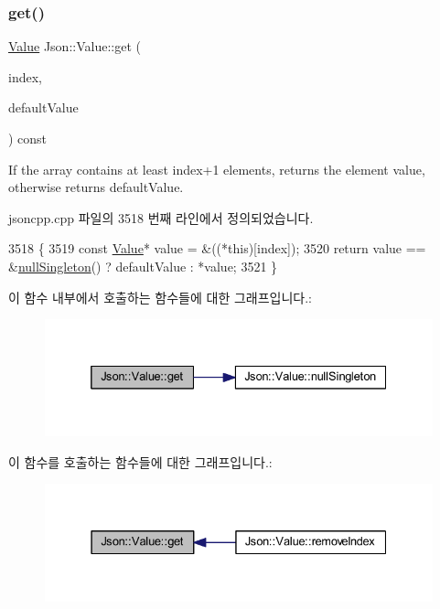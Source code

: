 \subsubsection{\texorpdfstring{get()}{get()}\hspace{0.1cm}{\footnotesize\ttfamily [1/4]}}
{\footnotesize\ttfamily \hyperlink{class_json_1_1_value}{Value} Json\+::\+Value\+::get (\begin{DoxyParamCaption}\item[{\hyperlink{class_json_1_1_value_a184a91566cccca7b819240f0d5561c7d}{Array\+Index}}]{index,  }\item[{const \hyperlink{class_json_1_1_value}{Value} \&}]{default\+Value }\end{DoxyParamCaption}) const}

If the array contains at least index+1 elements, returns the element value, otherwise returns default\+Value. 

jsoncpp.\+cpp 파일의 3518 번째 라인에서 정의되었습니다.


\begin{DoxyCode}
3518                                                                   \{
3519   \textcolor{keyword}{const} \hyperlink{class_json_1_1_value}{Value}* value = &((*this)[index]);
3520   \textcolor{keywordflow}{return} value == &\hyperlink{class_json_1_1_value_af2f124567acc35d021a424e53ebdfcab}{nullSingleton}() ? defaultValue : *value;
3521 \}
\end{DoxyCode}
이 함수 내부에서 호출하는 함수들에 대한 그래프입니다.\+:\nopagebreak
\begin{figure}[H]
\begin{center}
\leavevmode
\includegraphics[width=332pt]{class_json_1_1_value_a034eb7bf85a44fa759bdaa232788ca66_cgraph}
\end{center}
\end{figure}
이 함수를 호출하는 함수들에 대한 그래프입니다.\+:\nopagebreak
\begin{figure}[H]
\begin{center}
\leavevmode
\includegraphics[width=331pt]{class_json_1_1_value_a034eb7bf85a44fa759bdaa232788ca66_icgraph}
\end{center}
\end{figure}
\mbox{\label{class_json_1_1_value_a57de86629ed23246f14014fb6c44fa67}} 
